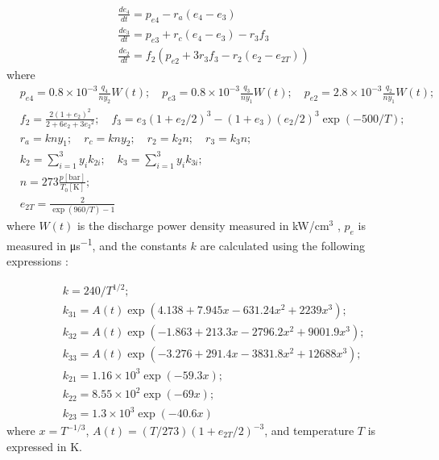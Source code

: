\documentclass{report}
\begin{document}
\begin{equation}\label{eq:dedt}
\begin{aligned}
&\frac{d e_4}{dt} = p_{e4} - r_a (e_4 - e_3)\\
&\frac{d e_3}{dt} = p_{e3} + r_c(e_4 - e_3) - r_3 f_3\\
&\frac{d e_2}{dt} = f_2 \left( p_{e2} + 3 r_3 f_3 - r_2 (e_2 - e_{2T}) \right)
\end{aligned}
\end{equation}
where
\begin{equation}\label{eq:dedt_rates}
\begin{aligned}
&p_{e4} = 0.8\times 10^{-3} \frac{q_4}{n y_2} W(t);\quad p_{e3} = 0.8\times 10^{-3}\frac{q_3}{n y_1} W(t);\quad p_{e2} = 2.8\times 10^{-3}\frac{q_2}{n y_1} W(t);\\
&f_2 = \frac{2(1+e_2)^2}{2+6e_2+3{e_2}^2};\quad f_3 = e_3(1+e_2/2)^3 - (1+e_3)(e_2/2)^3 \exp(- 500/T);\\
&r_a = kny_1;\quad r_c = kny_2;\quad r_2 = k_2n;\quad r_3 = k_3n;\\
&k_2 = \sum\limits_{i=1}^3 y_i k_{2i};\quad k_3 = \sum\limits_{i=1}^3 y_i k_{3i};\\
&n = 273 \frac{p[\text{bar}]}{T_0[\text{K}]};\\
&e_{2T} = \frac{2}{\exp(960/T)-1}
\end{aligned}
\end{equation}
where $W(t)$ is the discharge power density measured in {kW/cm$^3$} , $p_e$ is measured in \si{\micro\second^{-1}}, and the constants $k$ are calculated using the following expressions \cite{Biryukov-1974,Taylor-1969}:

\begin{equation}
\begin{aligned}
&k = 240 / T^{1/2};\\
&k_{31} = A(t)\exp(4.138 + 7.945x - 631.24x^2 + 2239x^3);\\
&k_{32} = A(t)\exp(-1.863 + 213.3x - 2796.2x^2 + 9001.9x^3);\\
&k_{33} = A(t)\exp(-3.276 + 291.4x - 3831.8x^2 + 12688x^3);\\
&k_{21} = 1.16 \times 10^3 \exp(-59.3x);\\
&k_{22} = 8.55 \times 10^2 \exp(-69x);\\
&k_{23} = 1.3 \times 10^3 \exp(-40.6x)
\end{aligned}
\end{equation}
where $x=T^{-1/3}$, $A(t)=(T/273)(1+e_{2T}/2)^{-3}$, and temperature $T$ is expressed in K.
\end{document}
